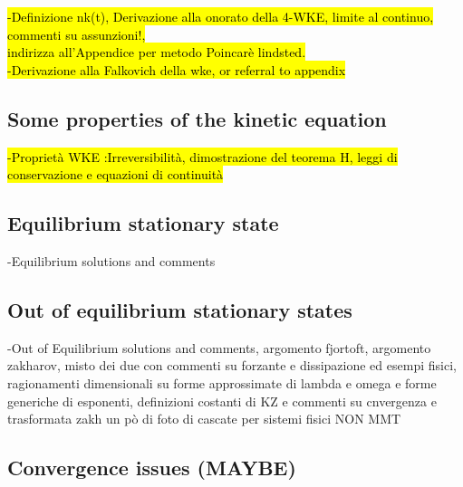 \hl{-Definizione nk(t), Derivazione alla onorato della 4-WKE, limite al continuo, commenti su assunzioni!, \\
indirizza all'Appendice per metodo Poincarè lindsted. \\
-Derivazione alla Falkovich della wke, or referral to appendix}\\
\subsection{Some properties of the kinetic equation}

\hl{-Proprietà WKE :Irreversibilità, dimostrazione del teorema H, leggi di conservazione e equazioni di continuità}

\subsection{Equilibrium stationary state}

-Equilibrium solutions and comments 

\subsection{Out of equilibrium stationary states}

-Out of Equilibrium solutions and comments, argomento fjortoft, argomento zakharov, misto dei due con commenti su forzante e dissipazione 
ed esempi fisici, ragionamenti dimensionali su forme approssimate di lambda e omega e forme generiche di esponenti, definizioni costanti di KZ e commenti su cnvergenza e 
trasformata zakh un pò di foto di cascate per sistemi fisici NON MMT

\subsection{Convergence issues (MAYBE)}